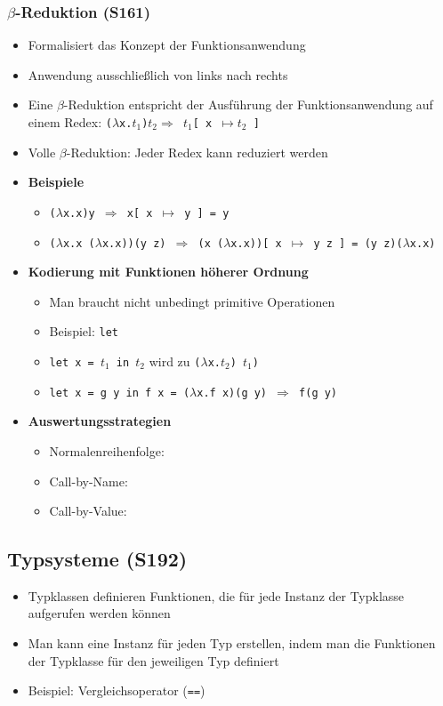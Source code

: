 \subsubsection{$\beta$-Reduktion (S161)}
\begin{itemize}
	\item Formalisiert das Konzept der Funktionsanwendung
	\item Anwendung ausschließlich von links nach rechts
	\item Eine \(\beta\)-Reduktion entspricht der Ausführung der Funktionsanwendung auf einem Redex: \texttt{(\(\lambda\)x.\(t_1\))\(t_2 \Rightarrow\) \(t_1\){[} x \(\mapsto t_2\) {]}}
	\item Volle \(\beta\)-Reduktion: Jeder Redex kann reduziert werden
	\item \textbf{Beispiele}
	\begin{itemize}
		\item \texttt{(\(\lambda\)x.x)y \(\Rightarrow\) x{[} x \(\mapsto\) y {]} = y}
		\item \texttt{(\(\lambda\)x.x (\(\lambda\)x.x))(y z) \(\Rightarrow\) (x (\(\lambda\)x.x)){[} x \(\mapsto\) y z {]} = (y z)(\(\lambda\)x.x)}
	\end{itemize}
	\item \textbf{Kodierung mit Funktionen höherer Ordnung}
	\begin{itemize}
		\item Man braucht nicht unbedingt primitive Operationen
		\item Beispiel: \texttt{let}
		\item \texttt{let x = \(t_1\) in \(t_2\)} wird zu \texttt{(\(\lambda\)x.\(t_2\)) \(t_1\))}
		\item \texttt{let x = g y in f x = (\(\lambda\)x.f x)(g y) \(\Rightarrow\) f(g y)}
	\end{itemize}
	\item \textbf{Auswertungsstrategien}
	\begin{itemize}
		\item Normalenreihenfolge: 
		\item Call-by-Name: 
		\item Call-by-Value:
	\end{itemize}
\end{itemize}


\subsection{Typsysteme (S192)}
\begin{itemize}
	\item Typklassen definieren Funktionen, die für jede Instanz der Typklasse aufgerufen werden können
	\item Man kann eine Instanz für jeden Typ erstellen, indem man die Funktionen der Typklasse für den jeweiligen Typ definiert
	\item Beispiel: Vergleichsoperator (\texttt{==})
\end{itemize}

